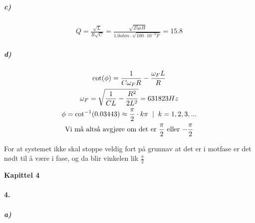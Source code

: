 \documentclass[11pt, A4paper,norsk]{article}
\begin{document}
			\subparagraph{c)}
				\begin{gather*}
Q = \frac{\sqrt{L}}{R\sqrt{C}} = \frac{\sqrt{25 \mu H}}{1.0 ohm \cdot \sqrt{100 \cdot 10^{-9} F}} = 15.8
				\end{gather*}









			\subparagraph{d)}
				\begin{gather*}
\cot(\phi) = \frac{1}{C \omega_F R} - \frac{\omega_F L}{R} \\
\omega_F = \sqrt{\frac{1}{CL} - \frac{R^2}{2 L^2}} = 631823 Hz \\
\phi = \cot^{-1} (0.03443) \approx \frac{\pi}{2} \cdot k \pi \hspace{2mm}|\hspace{2mm} k = 1,2,3,... \\
\text{Vi må altså avgjøre om det er $\frac{\pi}{2}$ eller $- \frac{\pi}{2}$}
				\end{gather*}
				\begin{flushleft}
For at systemet ikke skal stoppe veldig fort på grunnav at det er i motfase er det nødt til å være i fase, og da blir vinkelen lik $\frac{\pi}{2}$
				\end{flushleft}
\clearpage









	\begin{flushleft}
\textbf{Kapittel 4}
	\end{flushleft}
		\paragraph{4.}
			\subparagraph{a)} \hspace{1mm}
\end{document}

